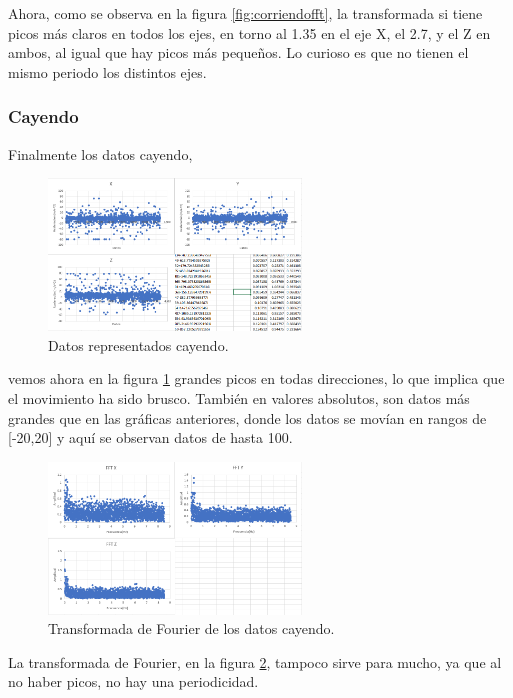 \documentclass[12pt]{article}
\numberwithin{equation}{section}
\begin{document}
{Ahora, como se observa en la figura \ref{fig:corriendofft}, la transformada si tiene picos más claros en todos los ejes, en torno al 1.35 en el eje X, el 2.7, y el Z en ambos, al igual que hay picos más pequeños. Lo curioso es que no tienen el mismo periodo los distintos ejes.

\subsubsection{Cayendo}

Finalmente los datos cayendo,
\begin{figure}[h]
    \centering
    \includegraphics[width=0.6\textwidth]{cayendoraw.png}
    \caption{Datos representados cayendo.}
    \label{fig:cayendoraw}
\end{figure}
vemos ahora en la figura \ref{fig:cayendoraw} grandes picos en todas direcciones, lo que implica que el movimiento ha sido brusco. También en valores absolutos, son datos más grandes que en las gráficas anteriores, donde los datos se movían en rangos de [-20,20] y aquí se observan datos de hasta 100.

\begin{figure}[h]
    \centering
    \includegraphics[width=0.6\textwidth]{cayendofft.png}
    \caption{Transformada de Fourier de los datos cayendo.}
    \label{fig:cayendofft}
\end{figure}

La transformada de Fourier, en la figura \ref{fig:cayendofft}, tampoco sirve para mucho, ya que al no haber picos, no hay una periodicidad.

}
\end{document}
